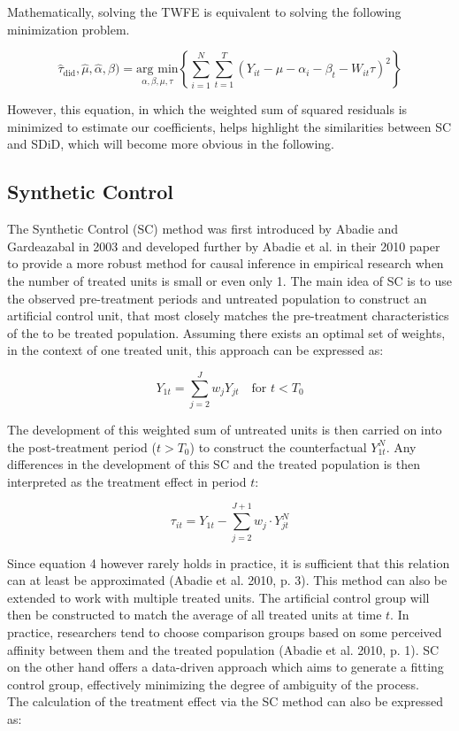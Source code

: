 \documentclass[8pt]{article}
\begin{document}
Mathematically, solving the TWFE is equivalent to solving the following minimization problem.

\begin{equation}
\hat{\tau}_{\text{did}}, \hat{\mu}, \hat{\alpha}, \hat{\beta}) = \underset{\alpha, \beta, \mu, \tau}{\text{arg min}} \left\{ \sum_{i=1}^{N} \sum_{t=1}^{T} \left( Y_{it} - \mu - \alpha_i - \beta_t - W_{it} \tau \right)^2 \right\}
\end{equation}

However, this equation, in which the weighted sum of squared residuals is minimized to estimate our coefficients, helps highlight the similarities between SC and SDiD, which will become more obvious in the following.


\subsection{Synthetic Control}
The Synthetic Control (SC) method was first introduced by Abadie and Gardeazabal in 2003 and developed further by Abadie et al. in their 2010 paper to provide a more robust method for causal inference in empirical research when the number of treated units is small or even only 1. The main idea of SC is to use the observed pre-treatment periods and untreated population to construct an artificial control unit, that most closely matches the pre-treatment characteristics of the to be treated population. Assuming there exists an optimal set of weights, in the context of one treated unit, this approach can be expressed as:

\begin{equation}
Y_{1t} = \sum_{j=2}^{J} w_{j} Y_{jt} \quad \text{for } t < T_0
\end{equation}

The development of this weighted sum of untreated units is then carried on into the post-treatment period ($t > T_0$) to construct the counterfactual $Y_{1t}^N$. Any differences in the development of this SC and the treated population is then interpreted as the treatment effect in period $t$: 

\begin{equation}
\tau_{it} = Y_{1t} - \sum_{j=2}^{J+1} w_j \cdot Y_{jt}^N
\end{equation}

Since equation 4 however rarely holds in practice, it is sufficient that this relation can at least be approximated (Abadie et al. 2010, p. 3).
This method can also be extended to work with multiple treated units. The artificial control group will then be constructed to match the average of all treated units at time $t$. In practice, researchers tend to choose comparison groups based on some perceived affinity between them and the treated population (Abadie et al. 2010, p. 1). SC on the other hand offers a data-driven approach which aims to generate a fitting control group, effectively minimizing the degree of ambiguity of the process. \\
 The calculation of the treatment effect via the SC method can also be expressed as:
\end{document}
